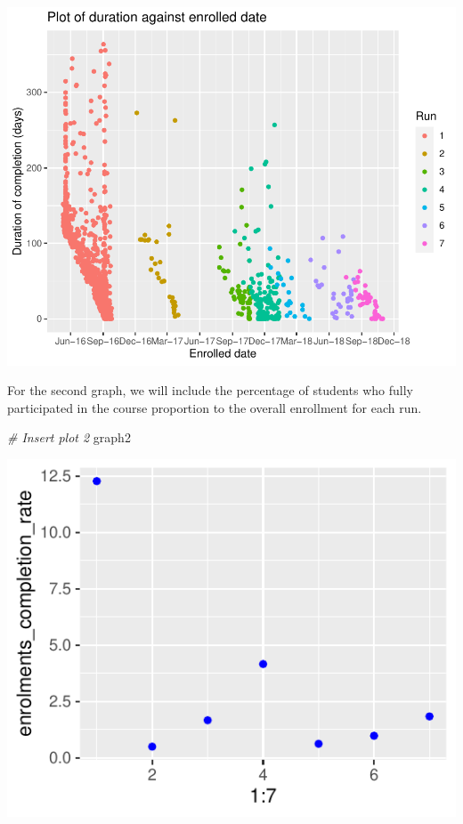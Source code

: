\documentclass[12pt,]{article}
\newenvironment{Shaded}{\begin{snugshade}}{\end{snugshade}}
\newcommand{\CommentTok}[1]{\textcolor[rgb]{0.56,0.35,0.01}{\textit{#1}}}
\newcommand{\NormalTok}[1]{#1}
\begin{document}
\begin{center}\includegraphics{report_files/figure-latex/unnamed-chunk-18-1} \end{center}

For the second graph, we will include the percentage of students who
fully participated in the course proportion to the overall enrollment
for each run.

\begin{Shaded}
\begin{Highlighting}[]
\CommentTok{\# Insert plot 2}
\NormalTok{graph2}
\end{Highlighting}
\end{Shaded}

\begin{center}\includegraphics{report_files/figure-latex/unnamed-chunk-19-1} \end{center}
\end{document}
